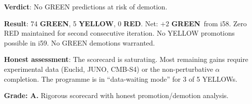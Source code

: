 \documentclass[11pt,a4paper]{article}
\newcommand{\GREEN}{\textcolor{dfdgreen}{\textbf{GREEN}}}
\newcommand{\YELLOW}{\textcolor{dfdyellow}{\textbf{YELLOW}}}
\newcommand{\RED}{\textcolor{dfdred}{\textbf{RED}}}
\begin{document}
\textbf{Verdict}: No GREEN predictions at risk of demotion.

\begin{tcolorbox}[colback=green!5!white, colframe=green!60!black, title={Agent 19: Scorecard --- 74/5/0, ZERO RED MAINTAINED}]
\textbf{Result}: 74 \GREEN, 5 \YELLOW, 0 \RED. Net: $+2$ \GREEN\ from i58. Zero RED maintained for second consecutive iteration. No YELLOW promotions possible in i59. No GREEN demotions warranted.

\textbf{Honest assessment}: The scorecard is saturating. Most remaining gains require experimental data (Euclid, JUNO, CMB-S4) or the non-perturbative $\alpha$ completion. The programme is in ``data-waiting mode'' for 3 of 5 YELLOWs.

\textbf{Grade: A.} Rigorous scorecard with honest promotion/demotion analysis.
\end{tcolorbox}
\end{document}
